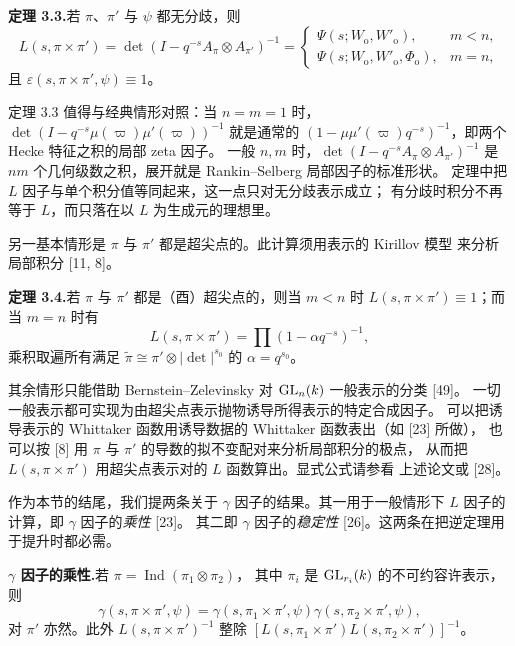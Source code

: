\textbf{定理 3.3.}\quad 若 $\pi$、$\pi'$ 与 $\psi$ 都无分歧，则
\[
L(s,\pi\times\pi')=\det(I-q^{-s}A_\pi\otimes A_{\pi'})^{-1}
=\begin{cases}
\Psi(s;W_{\mathrm{o}},W'_{\mathrm{o}}),&m<n,\\
\Psi(s;W_{\mathrm{o}},W'_{\mathrm{o}},\Phi_{\mathrm{o}}),&m=n,
\end{cases}
\]
且 $\varepsilon(s,\pi\times\pi',\psi)\equiv1$。
\begin{annote}
定理 3.3 值得与经典情形对照：当 $n=m=1$ 时，
$\det(I-q^{-s}\mu(\varpi)\mu'(\varpi))^{-1}$ 就是通常的
$(1-\mu\mu'(\varpi)q^{-s})^{-1}$，即两个 Hecke 特征之积的局部 zeta 因子。
一般 $n,m$ 时，$\det(I-q^{-s}A_\pi\otimes A_{\pi'})^{-1}$
是 $nm$ 个几何级数之积，展开就是 Rankin--Selberg 局部因子的标准形状。
定理中把 $L$ 因子与单个积分值等同起来，这一点只对无分歧表示成立；
有分歧时积分不再等于 $L$，而只落在以 $L$ 为生成元的理想里。
\par{}
\end{annote}

另一基本情形是 $\pi$ 与 $\pi'$ 都是超尖点的。此计算须用表示的 Kirillov 模型
来分析局部积分 [11, 8]。

\textbf{定理 3.4.}\quad 若 $\pi$ 与 $\pi'$ 都是（酉）超尖点的，则当 $m<n$ 时
$L(s,\pi\times\pi')\equiv1$；而当 $m=n$ 时有
\[
L(s,\pi\times\pi')=\prod(1-\alpha q^{-s})^{-1},
\]
乘积取遍所有满足 $\widetilde{\pi}\cong\pi'\otimes|\det|^{s_0}$ 的 $\alpha=q^{s_0}$。

其余情形只能借助 Bernstein--Zelevinsky 对 $\mathrm{GL}_n(k)$ 一般表示的分类 [49]。
一切一般表示都可实现为由超尖点表示抛物诱导所得表示的特定合成因子。
可以把诱导表示的 Whittaker 函数用诱导数据的 Whittaker 函数表出（如 [23] 所做），
也可以按 [8] 用 $\pi$ 与 $\pi'$ 的导数的拟不变配对来分析局部积分的极点，
从而把 $L(s,\pi\times\pi')$ 用超尖点表示对的 $L$ 函数算出。显式公式请参看
上述论文或 [28]。

作为本节的结尾，我们提两条关于 $\gamma$ 因子的结果。其一用于一般情形下
$L$ 因子的计算，即 $\gamma$ 因子的\emph{乘性} [23]。
其二即 $\gamma$ 因子的\emph{稳定性} [26]。这两条在把逆定理用于提升时都必需。

\textbf{$\gamma$ 因子的乘性.}\quad 若 $\pi=\operatorname{Ind}(\pi_1\otimes\pi_2)$，
其中 $\pi_i$ 是 $\mathrm{GL}_{r_i}(k)$ 的不可约容许表示，则
\[
\gamma(s,\pi\times\pi',\psi)=\gamma(s,\pi_1\times\pi',\psi)\gamma(s,\pi_2\times\pi',\psi),
\]
对 $\pi'$ 亦然。此外 $L(s,\pi\times\pi')^{-1}$ 整除
$[L(s,\pi_1\times\pi')L(s,\pi_2\times\pi')]^{-1}$。

